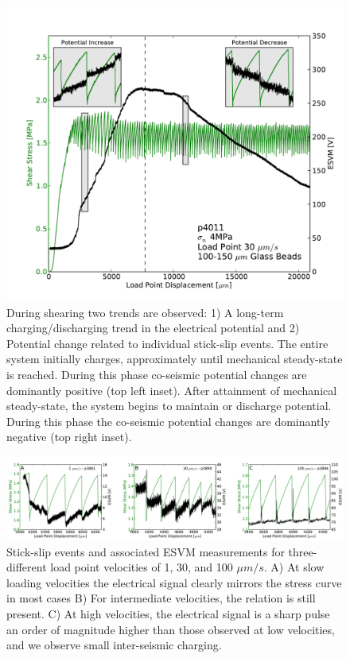 \begin{figure}
\includegraphics[width=40pc]{chap_electrical/elec_runplot.pdf}
\caption{During shearing two trends are observed: 1) A long-term charging/discharging trend in the electrical potential and 2) Potential change related to individual stick-slip events. The entire system initially charges, approximately until mechanical steady-state is reached. During this phase co-seismic potential changes are dominantly positive (top left inset).  After attainment of mechanical steady-state, the system begins to maintain or discharge potential.  During this phase the co-seismic potential changes are dominantly negative (top right inset).}
\label{electrical_runplot}
\end{figure}

\begin{figure}
\includegraphics[width=45pc]{chap_electrical/elec_zooms.pdf}
\caption{Stick-slip events and associated ESVM measurements for three-different load point velocities of 1, 30, and 100 $\mu m/s$.  A) At slow loading velocities the electrical signal clearly mirrors the stress curve in most cases  B) For intermediate velocities, the relation is still present. C) At high velocities, the electrical signal is a sharp pulse an order of magnitude higher than those observed at low velocities, and we observe small inter-seismic charging.}
\label{electrical_zooms}
\end{figure}

